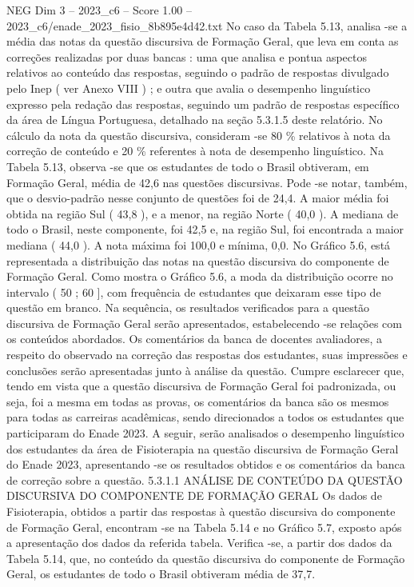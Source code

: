 \begin{textsample}{NEG Dim 3 – 2023\_c6 – Score 1.00 – 2023\_c6/enade\_2023\_fisio\_8b895e4d42.txt}
No caso da Tabela 5.13, analisa -se a média das notas da questão discursiva de Formação Geral, que leva em conta as correções realizadas por duas bancas : uma que analisa e pontua aspectos relativos ao conteúdo das respostas, seguindo o padrão de respostas divulgado pelo Inep ( ver Anexo VIII ) ; e outra que avalia o desempenho linguístico expresso pela redação das respostas, seguindo um padrão de respostas específico da área de Língua Portuguesa, detalhado na seção 5.3.1.5 deste relatório.
No cálculo da nota da questão discursiva, consideram -se 80 \% relativos à nota da correção de conteúdo e 20 \% referentes à nota de desempenho linguístico.
Na Tabela 5.13, observa -se que os estudantes de todo o Brasil obtiveram, em Formação Geral, média de 42,6 nas questões discursivas.
Pode -se notar, também, que o desvio-padrão nesse conjunto de questões foi de 24,4.
A maior média foi obtida na região Sul ( 43,8 ), e a menor, na região Norte ( 40,0 ).
A mediana de todo o Brasil, neste componente, foi 42,5 e, na região Sul, foi encontrada a maior mediana ( 44,0 ).
A nota máxima foi 100,0 e mínima, 0,0.
No Gráfico 5.6, está representada a distribuição das notas na questão discursiva do componente de Formação Geral.
Como mostra o Gráfico 5.6, a moda da distribuição ocorre no intervalo ( 50 ; 60 ], com frequência de estudantes que deixaram esse tipo de questão em branco.
Na sequência, os resultados verificados para a questão discursiva de Formação Geral serão apresentados, estabelecendo -se relações com os conteúdos abordados.
Os comentários da banca de docentes avaliadores, a respeito do observado na correção das respostas dos estudantes, suas impressões e conclusões serão apresentadas junto à análise da questão.
Cumpre esclarecer que, tendo em vista que a questão discursiva de Formação Geral foi padronizada, ou seja, foi a mesma em todas as provas, os comentários da banca são os mesmos para todas as carreiras acadêmicas, sendo direcionados a todos os estudantes que participaram do Enade 2023.
A seguir, serão analisados o desempenho linguístico dos estudantes da área de Fisioterapia na questão discursiva de Formação Geral do Enade 2023, apresentando -se os resultados obtidos e os comentários da banca de correção sobre a questão. 5.3.1.1 ANÁLISE DE CONTEÚDO DA QUESTÃO DISCURSIVA DO COMPONENTE DE FORMAÇÃO GERAL Os dados de Fisioterapia, obtidos a partir das respostas à questão discursiva do componente de Formação Geral, encontram -se na Tabela 5.14 e no Gráfico 5.7, exposto após a apresentação dos dados da referida tabela.
Verifica -se, a partir dos dados da Tabela 5.14, que, no conteúdo da questão discursiva do componente de Formação Geral, os estudantes de todo o Brasil obtiveram média de 37,7.

\end{textsample}

